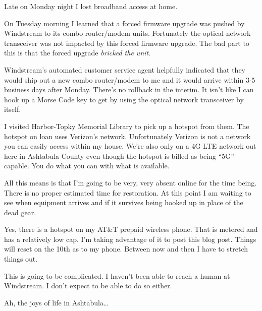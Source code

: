Late on Monday night I lost broadband access at home.

On Tuesday morning I learned that a forced firmware upgrade was pushed
by Windstream to its combo router/modem units. Fortunately the optical
network transceiver was not impacted by this forced firmware upgrade.
The bad part to this is that the forced upgrade \emph{bricked the unit}.

Windstream's automated customer service agent helpfully indicated that
they would ship out a new combo router/modem to me and it would arrive
within 3-5 business days after Monday. There's no rollback in the
interim. It isn't like I can hook up a Morse Code key to get by using
the optical network transceiver by itself.

I visited Harbor-Topky Memorial Library to pick up a hotspot from them.
The hotspot on loan uses Verizon's network. Unfortunately Verizon is not
a network you can easily access within my house. We're also only on a 4G
LTE network out here in Ashtabula County even though the hotspot is
billed as being ``5G'' capable. You do what you can with what is
available.

All this means is that I'm going to be very, very absent online for the
time being. There is no proper estimated time for restoration. At this
point I am waiting to see when equipment arrives and if it survives
being hooked up in place of the dead gear.

Yes, there is a hotspot on my AT\&T prepaid wireless phone. That is
metered and has a relatively low cap. I'm taking advantage of it to post
this blog post. Things will reset on the 10th as to my phone. Between
now and then I have to stretch things out.

This is going to be complicated. I haven't been able to reach a human at
Windstream. I don't expect to be able to do so either.

Ah, the joys of life in Ashtabula\ldots{}
